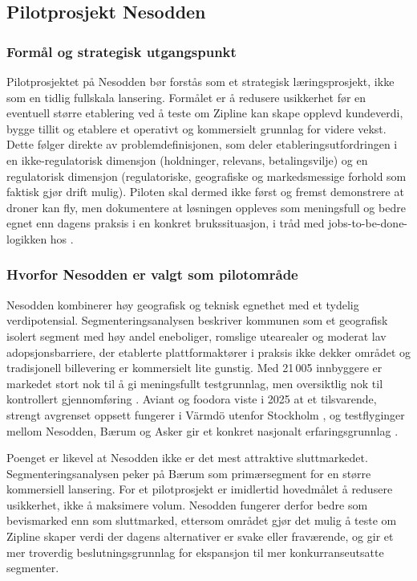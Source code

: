 \subsection{Pilotprosjekt Nesodden}

\subsubsection{Formål og strategisk utgangspunkt}

Pilotprosjektet på Nesodden bør forstås som et strategisk læringsprosjekt,
ikke som en tidlig fullskala lansering. Formålet er å redusere usikkerhet
før en eventuell større etablering ved å teste om Zipline kan skape opplevd
kundeverdi, bygge tillit og etablere et operativt og kommersielt grunnlag
for videre vekst. Dette følger direkte av problemdefinisjonen, som deler
etableringsutfordringen i en ikke-regulatorisk dimensjon (holdninger,
relevans, betalingsvilje) og en regulatorisk dimensjon (regulatoriske,
geografiske og markedsmessige forhold som faktisk gjør drift mulig). Piloten
skal dermed ikke først og fremst demonstrere at droner kan fly, men
dokumentere at løsningen oppleves som meningsfull og bedre egnet enn dagens
praksis i en konkret brukssituasjon, i tråd med jobs-to-be-done-logikken hos
\textcite{christensen2016}.

\subsubsection{Hvorfor Nesodden er valgt som pilotområde}

Nesodden kombinerer høy geografisk og teknisk egnethet med et tydelig
verdipotensial. Segmenteringsanalysen beskriver kommunen som et geografisk
isolert segment med høy andel eneboliger, romslige utearealer og moderat lav
adopsjonsbarriere, der etablerte plattformaktører i praksis ikke dekker
området og tradisjonell billevering er kommersielt lite gunstig. Med 21\,005
innbyggere er markedet stort nok til å gi meningsfullt testgrunnlag, men
oversiktlig nok til kontrollert gjennomføring
\parencite{ssb2026_befolkning}. Aviant og foodora viste i 2025 at et
tilsvarende, strengt avgrenset oppsett fungerer i Värmdö utenfor Stockholm
\parencite{aviant2025, tele22025}, og testflyginger mellom Nesodden, Bærum
og Asker gir et konkret nasjonalt erfaringsgrunnlag
\parencite{stortingsmelding2025}.

Poenget er likevel at Nesodden ikke er det mest attraktive sluttmarkedet.
Segmenteringsanalysen peker på Bærum som primærsegment for en større
kommersiell lansering. For et pilotprosjekt er imidlertid hovedmålet å
redusere usikkerhet, ikke å maksimere volum. Nesodden fungerer derfor bedre
som bevismarked enn som sluttmarked, ettersom området gjør det mulig å
teste om Zipline skaper verdi der dagens alternativer er svake eller
fraværende, og gir et mer troverdig beslutningsgrunnlag for ekspansjon til
mer konkurranseutsatte segmenter.

